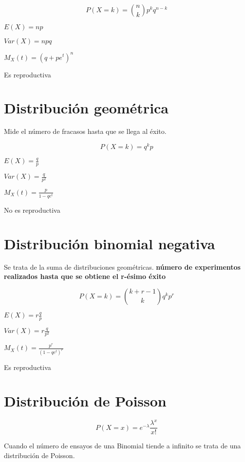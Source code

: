$$P(X=k) = {n \choose k}p^kq^{n-k}$$
\begin{itemize*}
\item $E(X)=np$
\item $Var(X)=npq$
\item $M_X(t)=(q+pe^t)^n$
\item Es reproductiva
\end{itemize*}

\section{Distribución geométrica}

Mide el número de fracasos hasta que se llega al éxito.

$$P(X=k)=q^kp$$

\begin{itemize*}
\item $E(X)=\frac{q}{p}$
\item $Var(X)=\frac{q}{p^2}$
\item $M_X(t)=\frac{p}{1-qe^t}$
\item No es reproductiva
\end{itemize*}

\section{Distribución binomial negativa}

Se trata de la suma de distribuciones geométricas. \textbf{número de experimentos
  realizados hasta que se obtiene el r-ésimo éxito}

$$P(X=k)={k+r-1 \choose k}q^kp^r $$

\begin{itemize*}
\item $E(X)=r\frac{q}{p}$
\item $Var(X)=r\frac{q}{p^2}$
\item $M_X(t)=\frac{p^r}{(1-qe^t)^r}$
\item Es reproductiva
\end{itemize*}

\section{Distribución de Poisson}

$$P(X=x)=e^{-\lambda}\frac{\lambda^x}{x!}$$

Cuando el número de ensayos de una Binomial tiende a infinito
se trata de una distribución de Poisson.

